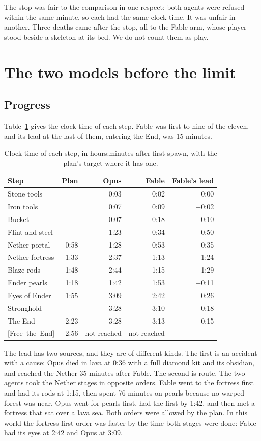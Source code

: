 \documentclass[11pt,a4paper]{article}
\newcommand{\adv}[1]{\mbox{\textsf{[#1]}}}
\begin{document}
The stop was fair to the comparison in one respect: both agents were refused within the same minute, so each had the same clock time. It was unfair in another. Three deaths came after the stop, all to the Fable arm, whose player stood beside a skeleton at its bed. We do not count them as play.

\section{The two models before the limit}
\label{sec:bench}

\subsection{Progress}

Table~\ref{tab:steps} gives the clock time of each step. Fable was first to nine of the eleven, and its lead at the last of them, entering the End, was 15 minutes.

\begin{table}[H]
\caption{Clock time of each step, in hours:minutes after first spawn, with the plan's target where it has one.}
\label{tab:steps}
\begin{tabularx}{0.82\textwidth}{@{}Xrrrr@{}}
\toprule
Step & Plan & Opus & Fable & Fable's lead \\
\midrule
Stone tools & & 0:03 & 0:02 & 0:00 \\
Iron tools & & 0:07 & 0:09 & $-$0:02 \\
Bucket & & 0:07 & 0:18 & $-$0:10 \\
Flint and steel & & 1:23 & 0:34 & 0:50 \\
Nether portal & 0:58 & 1:28 & 0:53 & 0:35 \\
Nether fortress & 1:33 & 2:37 & 1:13 & 1:24 \\
Blaze rods & 1:48 & 2:44 & 1:15 & 1:29 \\
Ender pearls & 1:18 & 1:42 & 1:53 & $-$0:11 \\
Eyes of Ender & 1:55 & 3:09 & 2:42 & 0:26 \\
Stronghold & & 3:28 & 3:10 & 0:18 \\
The End & 2:23 & 3:28 & 3:13 & 0:15 \\
\adv{Free the End} & 2:56 & not reached & not reached & \\
\bottomrule
\end{tabularx}
\end{table}

The lead has two sources, and they are of different kinds. The first is an accident with a cause: Opus died in lava at 0:36 with a full diamond kit and its obsidian, and reached the Nether 35 minutes after Fable. The second is route. The two agents took the Nether stages in opposite orders. Fable went to the fortress first and had its rods at 1:15, then spent 76 minutes on pearls because no warped forest was near. Opus went for pearls first, had the first by 1:42, and then met a fortress that sat over a lava sea. Both orders were allowed by the plan. In this world the fortress-first order was faster by the time both stages were done: Fable had its eyes at 2:42 and Opus at 3:09.
\end{document}
